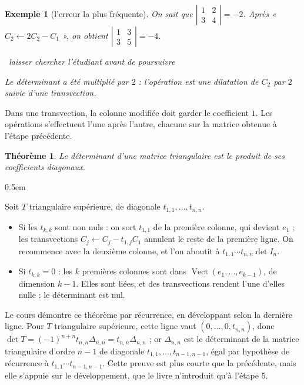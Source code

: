 \documentclass[a4paper,11pt]{article}
\makeatletter
\numberwithin{equation}{section}
\numberwithin{figure}{section}
\numberwithin{table}{section}
\theoremstyle{enonce}
\newtheorem{theoreme}[definition]{Théorème}
\theoremstyle{exemple}
\newtheorem{exemple}[definition]{Exemple}
\theoremstyle{remarque}
\renewcommand{\proofname}{Démonstration}
\renewenvironment{proof}[1][\proofname]{\par\pushQED{\qed}\normalfont
  \topsep0.5em\relax\trivlist\item[\hskip\labelsep\sffamily\itshape\color{Gris}#1.]\ignorespaces}
  {\popQED\endtrivlist\@endpefalse}
\newcommand{\chercher}{\par\smallskip\noindent{\color{Filet}\rule[0.5ex]{1.2cm}{0.4pt}}\
  {\footnotesize\sffamily\itshape\color{Gris}laisser chercher l'étudiant avant de poursuivre}\par\smallskip}
\newcommand{\marge}[1]{\leavevmode\marginpar{\raggedleft\scriptsize\sffamily\color{Gris}\textls[100]{\MakeUppercase{#1}}}\ignorespaces}
\newcommand{\vect}{\operatorname{Vect}}
\newcommand{\dt}[1]{\left|\begin{matrix}#1\end{matrix}\right|}
\makeatother
\begin{document}
\marge{Ensemble}
\begin{exemple}[l'erreur la plus fréquente]
On sait que $\dt{1&2\\3&4}=-2$. Après « $C_2\leftarrow2C_2-C_1$ », on obtient $\dt{1&3\\3&5}=-4$.
\chercher
Le déterminant a été multiplié par $2$ : l'opération est une dilatation de $C_2$ par $2$ suivie d'une transvection.
\end{exemple}

\begin{attention}
Dans une transvection, la colonne modifiée doit garder le coefficient $1$. Les opérations s'effectuent l'une après
l'autre, chacune sur la matrice obtenue à l'étape précédente.
\end{attention}

\marge{Expliquer}
\begin{theoreme}\label{thm:tri}
Le déterminant d'une matrice triangulaire est le produit de ses coefficients diagonaux.
\end{theoreme}

\begin{proof}
Soit $T$ triangulaire supérieure, de diagonale $t_{1,1},\dots,t_{n,n}$.
\begin{itemize}
\item Si les $t_{k,k}$ sont non nuls : on sort $t_{1,1}$ de la première colonne, qui devient $e_1$ ; les transvections
      $C_j\leftarrow C_j-t_{1,j}C_1$ annulent le reste de la première ligne. On recommence avec la deuxième colonne, et
      l'on aboutit à $t_{1,1}\cdots t_{n,n}\det I_n$.
\item Si $t_{k,k}=0$ : les $k$ premières colonnes sont dans $\vect(e_1,\dots,e_{k-1})$, de dimension $k-1$. Elles sont
      liées, et des transvections rendent l'une d'elles nulle : le déterminant est nul.\qedhere
\end{itemize}
\end{proof}

\begin{votrecours}
Le cours démontre ce théorème par récurrence, en développant selon la dernière ligne. Pour $T$ triangulaire supérieure,
cette ligne vaut $(0,\dots,0,t_{n,n})$, donc $\det T=(-1)^{n+n}t_{n,n}\Delta_{n,n}=t_{n,n}\Delta_{n,n}$ ; or $\Delta_{n,n}$
est le déterminant de la matrice triangulaire d'ordre $n-1$ de diagonale $t_{1,1},\dots,t_{n-1,n-1}$, égal par hypothèse
de récurrence à $t_{1,1}\cdots t_{n-1,n-1}$. Cette preuve est plus courte que la précédente, mais elle s'appuie sur le
développement, que le livre n'introduit qu'à l'étape 5.
\end{votrecours}
\end{document}
